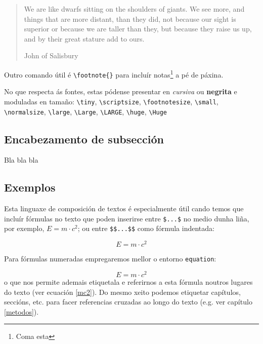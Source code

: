 \documentclass[a4paper,11pt,openright,twoside]{report}      %
\begin{document}
\begin{quote}                           %
    We are like dwarfs sitting on the shoulders of giants. We see more, and things that are more distant, than they did, not because our sight is superior or because we are taller than they, but because they raise us up, and by their great stature add to ours.
    
    \hfill John of Salisbury
\end{quote}                             %

Outro comando útil é \verb+\footnote{}+ para incluír notas\footnote{Coma esta} a pé de páxina.


No que respecta ás fontes, estas pódense presentar en \textit{cursiva} ou \textbf{negrita} e moduladas en tamaño: {\tiny \verb+\tiny+}, {\scriptsize \verb+\scriptsize+}, {\footnotesize \verb+\footnotesize+}, {\small \verb+\small+}, {\normalsize \verb+\normalsize+}, {\large \verb+\large+}, {\Large \verb+\Large+}, {\LARGE \verb+\LARGE+}, {\huge \verb+\huge+}, {\Huge \verb+\Huge+}

 
\subsection{Encabezamento de subsección} 

Bla bla bla

\subsection{Exemplos}

Esta linguaxe de composición de textos é especialmente útil cando temos que incluír fórmulas no texto que poden inserirse entre \verb+$...$+ no medio dunha liña, por exemplo, $E=m\cdot c^2$; ou entre \verb+$$...$$+ como fórmula indentada:

$$E=m\cdot c^2$$

Para fórmulas numeradas empregaremos mellor o entorno \verb+equation+:

\begin{equation}
\label{mc2}
    E=m\cdot c^2
\end{equation}
o que nos permite ademais etiquetala e referirnos a esta fórmula noutros lugares do texto (ver ecuación \ref{mc2}). Do mesmo xeito podemos etiquetar capítulos, seccións, etc. para facer referencias cruzadas ao longo do texto (e.g. ver capítulo \ref{metodos}).
\end{document}
